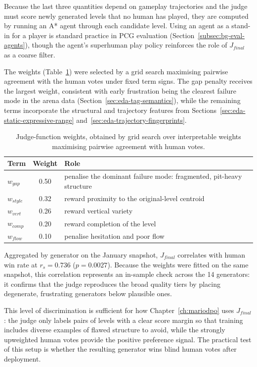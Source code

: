 \documentclass[shortabstract, mgr, english]{iithesis}
\begin{document}
Because the last three quantities depend on gameplay trajectories and the judge must score
newly generated levels that no human has played, they are computed by
running an A* agent through each candidate level. Using an agent as
a stand-in for a player is standard practice in PCG evaluation
(Section~\ref{subsec:bg-eval-agents}), though the agent's superhuman play policy reinforces the role of $J_{final}$ as a coarse filter.

The weights (Table~\ref{tab:dpo-judge-weights}) were selected by a
grid search maximising pairwise agreement with the human votes under
fixed term signs. The
gap penalty receives the largest weight, consistent with early frustration being the clearest
failure mode in the arena data
(Section~\ref{sec:eda-tag-semantics}), while the remaining terms
incorporate the structural and trajectory features from
Sections~\ref{sec:eda-static-expressive-range}
and~\ref{sec:eda-trajectory-fingerprints}.

\begin{table}[H]
\centering
\begin{tabular}{@{} l c p{7.2cm} @{}}
\toprule
\textbf{Term} & \textbf{Weight} & \textbf{Role} \\
\midrule
$w_{gap}$   & 0.50 & penalise the dominant failure mode: fragmented, pit-heavy structure \\
$w_{style}$ & 0.32 & reward proximity to the original-level centroid \\
$w_{vert}$  & 0.26 & reward vertical variety \\
$w_{comp}$  & 0.20 & reward completion of the level \\
$w_{flow}$  & 0.10 & penalise hesitation and poor flow \\
\bottomrule
\end{tabular}
\caption{Judge-function weights, obtained by grid search over
interpretable weights maximising pairwise agreement with human votes.}
\label{tab:dpo-judge-weights}
\end{table}

Aggregated by generator on the January snapshot, $J_{final}$
correlates with human win rate at $r_s = 0.736$ ($p = 0.0027$). Because the weights were fitted on the same snapshot, this correlation represents an in-sample check across the 14
generators: it confirms that
the judge reproduces the broad quality tiers by placing
degenerate, frustrating generators below plausible ones.

This level of discrimination is sufficient for how Chapter~\ref{ch:mariodpo}
uses $J_{final}$: the judge only labels pairs of levels with a clear score margin so that training includes diverse examples
of flawed structure to avoid, while the strongly upweighted human votes provide the positive preference signal. The practical test of this setup is whether the resulting generator wins blind
human votes after deployment.
\end{document}
